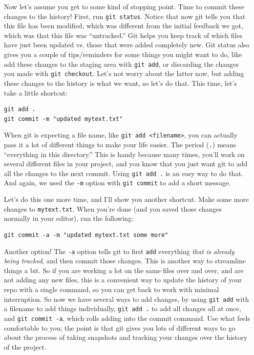 \documentclass{article}
\begin{document}
Now let's assume you get to some kind of stopping point.  Time to commit these changes to the history!  First, run \texttt{git status}.  Notice that now git tells you that this file has been modified, which was different from the initial feedback we got, which was that this file was ``untracked.'' Git helps you keep track of which files have just been updated vs. those that were added completely new.  Git status also gives you a couple of tips/reminders for some things you might want to do, like add these changes to the staging area with \texttt{git add}, or discarding the changes you made with \texttt{git checkout}.  Let's not worry about the latter now, but adding these changes to the history is what we want, so let's do that.  This time, let's take a little shortcut:


\begin{verbatim}
git add .
git commit -m "updated mytext.txt"
\end{verbatim}

When git is expecting a file name, like \texttt{git add <filename>}, you can actually pass it a lot of different things to make your life easier.  The period (\texttt{.}) means ``everything in this directory.''  This is handy because many times, you'll work on several different files in your project, and you know that you just want git to add all the changes to the next commit.  Using \texttt{git add .} is an easy way to do that.  And again, we used the \texttt{-m} option with \texttt{git commit} to add a short message.

Let's do this one more time, and I'll show you another shortcut. Make some more changes to \texttt{mytext.txt}.  When you're done (and you saved those changes normally in your editor), run the following:


\begin{verbatim}
git commit -a -m "updated mytext.txt some more"
\end{verbatim}

Another option! The \texttt{-a} option tells git to first \texttt{add} everything \emph{that is already being tracked}, and then commit those changes.  This is another way to streamline things a bit.  So if you are working a lot on the same files over and over, and are not adding any new files, this is a convenient way to update the history of your repo with a single command, so you can get back to work with minimal interruption.  So now we have several ways to add changes, by using \texttt{git add} with a filename to add things individually, \texttt{git add .} to add all changes all at once, and \texttt{git commit -a}, which rolls adding into the commit command.  Use what feels comfortable to you; the point is that git gives you lots of different ways to go about the process of taking snapshots and tracking your changes over the history of the project.
\end{document}
